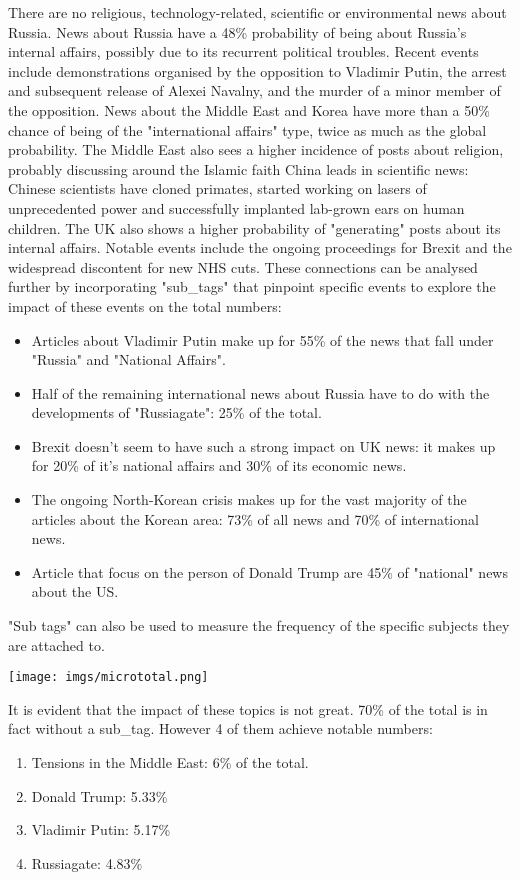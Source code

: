 \documentclass{article}
\begin{document}
There are no religious, technology-related, scientific or environmental news about Russia. News about Russia have a 48\% probability of being about Russia's internal affairs, possibly due to its recurrent political troubles. Recent events include demonstrations organised by the opposition to Vladimir Putin, the arrest and subsequent release of Alexei Navalny, and the murder of a minor member of the opposition.
News about the Middle East and Korea have more than a 50\% chance of being of the "international affairs" type, twice as much as the global probability. The Middle East also sees a higher incidence of posts about religion, probably discussing around the Islamic faith 
China leads in scientific news: Chinese scientists have cloned primates, started working on lasers of unprecedented power and successfully implanted lab-grown ears on human children.
The UK also shows a higher probability of "generating" posts about its internal affairs. Notable events include the ongoing proceedings for Brexit and the widespread discontent for new NHS cuts.
These connections can be analysed further by incorporating "sub\_tags" that pinpoint specific events to explore the impact of these events on the total numbers:
\begin{itemize}
\item Articles about Vladimir Putin make up for 55\% of the news that fall under "Russia" and "National Affairs".
\item Half of the remaining international news about Russia have to do with the developments of "Russiagate": 25\% of the total.
\item Brexit doesn't seem to have such a strong impact on UK news: it makes up for 20\% of it's national affairs and 30\% of its economic news.
\item The ongoing North-Korean crisis makes up for the vast majority of the articles about the Korean area: 73\% of all news and 70\% of international news.
\item Article that focus on the person of Donald Trump are 45\% of "national" news about the US.
\end{itemize}

"Sub tags" can also be used to measure the frequency of the specific subjects they are attached to.

\bigskip

\texttt{[image: imgs/micrototal.png]}

\bigskip

It is evident that the impact of these topics is not great. 70\% of the total is in fact without a sub\_tag. However 4 of them achieve notable numbers: 
\begin{enumerate}
\item Tensions in the Middle East: 6\% of the total.
\item Donald Trump: 5.33\%
\item Vladimir Putin: 5.17\%
\item Russiagate: 4.83\%
\end{enumerate}
\end{document}
